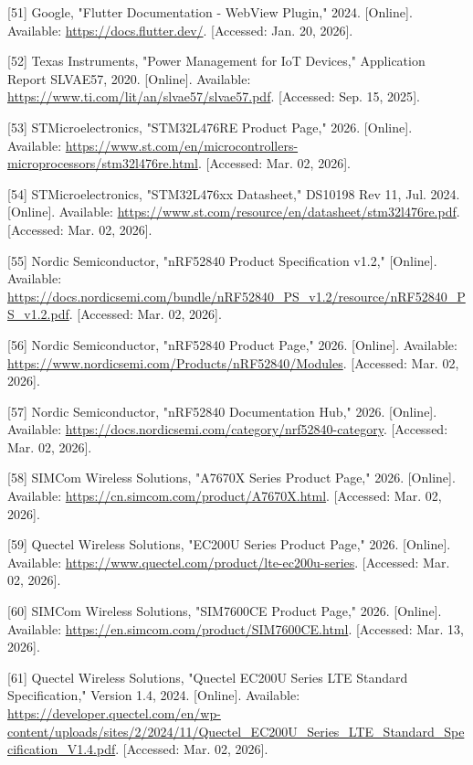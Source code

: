 \documentclass[a4paper]{extarticle}
\begin{document}
{[}51{]} Google, "Flutter Documentation - WebView Plugin," 2024.
{[}Online{]}. Available: \url{https://docs.flutter.dev/}. {[}Accessed:
Jan. 20, 2026{]}.

{[}52{]} Texas Instruments, "Power Management for IoT Devices,"
Application Report SLVAE57, 2020. {[}Online{]}. Available:
\url{https://www.ti.com/lit/an/slvae57/slvae57.pdf}. {[}Accessed: Sep.
15, 2025{]}.

{[}53{]} STMicroelectronics, "STM32L476RE Product Page," 2026.
{[}Online{]}. Available:
\url{https://www.st.com/en/microcontrollers-microprocessors/stm32l476re.html}.
{[}Accessed: Mar. 02, 2026{]}.

{[}54{]} STMicroelectronics, "STM32L476xx Datasheet," DS10198 Rev 11,
Jul. 2024. {[}Online{]}. Available:
\url{https://www.st.com/resource/en/datasheet/stm32l476re.pdf}.
{[}Accessed: Mar. 02, 2026{]}.

{[}55{]} Nordic Semiconductor, "nRF52840 Product Specification v1.2,"
{[}Online{]}. Available:
\url{https://docs.nordicsemi.com/bundle/nRF52840_PS_v1.2/resource/nRF52840_PS_v1.2.pdf}.
{[}Accessed: Mar. 02, 2026{]}.

{[}56{]} Nordic Semiconductor, "nRF52840 Product Page," 2026.
{[}Online{]}. Available:
\url{https://www.nordicsemi.com/Products/nRF52840/Modules}. {[}Accessed:
Mar. 02, 2026{]}.

{[}57{]} Nordic Semiconductor, "nRF52840 Documentation Hub," 2026.
{[}Online{]}. Available:
\url{https://docs.nordicsemi.com/category/nrf52840-category}.
{[}Accessed: Mar. 02, 2026{]}.

{[}58{]} SIMCom Wireless Solutions, "A7670X Series Product Page," 2026.
{[}Online{]}. Available:
\url{https://cn.simcom.com/product/A7670X.html}. {[}Accessed: Mar. 02,
2026{]}.

{[}59{]} Quectel Wireless Solutions, "EC200U Series Product Page," 2026.
{[}Online{]}. Available:
\url{https://www.quectel.com/product/lte-ec200u-series}. {[}Accessed:
Mar. 02, 2026{]}.

{[}60{]} SIMCom Wireless Solutions, "SIM7600CE Product Page," 2026.
{[}Online{]}. Available:
\url{https://en.simcom.com/product/SIM7600CE.html}. {[}Accessed: Mar.
13, 2026{]}.

{[}61{]} Quectel Wireless Solutions, "Quectel EC200U Series LTE Standard
Specification," Version 1.4, 2024. {[}Online{]}. Available:
\url{https://developer.quectel.com/en/wp-content/uploads/sites/2/2024/11/Quectel_EC200U_Series_LTE_Standard_Specification_V1.4.pdf}.
{[}Accessed: Mar. 02, 2026{]}.
\end{document}
